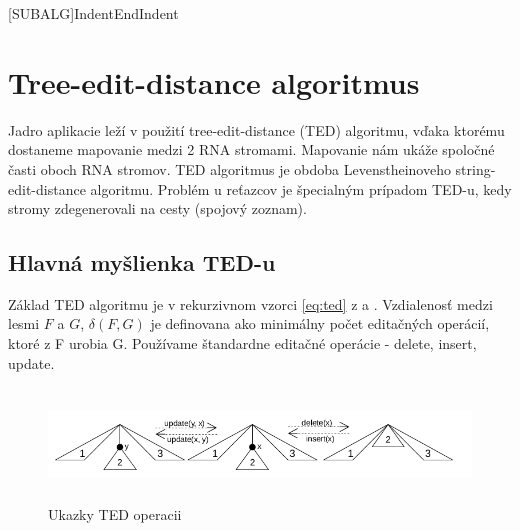 \newcommand{\Cdel}{\ensuremath{c_{del}}}
\newcommand{\Cins}{\ensuremath{c_{ins}}}
\newcommand{\Cupd}{\ensuremath{c_{upd}}}

\newcommand{\AfullDecomposition}{\ensuremath{\mathcal{A}}}
\newcommand{\FrelevantSubforests}{\ensuremath{\mathcal{F}}}
\newcommand{\pluseq}{\stackrel{+}{=}}
\newcommand{\AlgCase}{$\left\{\rule{0pt}{\baselineskip}\right.$\parbox{\textwidth}}

\newcommand{\rtedCostSum}[3]{\sum_{{#1}' \in #1 - \gamma^{#2}(#1)}cena({#1}', #3)}


[SUBALG]{Indent}{EndIndent}{}{\algorithmicend\ }


\chapter{Tree-edit-distance algoritmus}

Jadro aplikacie leží v použití tree-edit-distance (TED) algoritmu,
vďaka ktorému dostaneme mapovanie medzi 2 RNA stromami. Mapovanie nám ukáže
spoločné časti oboch RNA stromov. TED algoritmus je obdoba Levenstheinoveho
string-edit-distance algoritmu. Problém u reťazcov je špecialným prípadom
TED-u, kedy stromy zdegenerovali na cesty (spojový zoznam).

\section{Hlavná myšlienka TED-u}

Základ TED algoritmu je v rekurzivnom vzorci \ref{eq:ted} z \citet{DMRW} a \citet{RTED}. Vzdialenosť medzi
lesmi $F$ a $G$, $\delta(F, G)$ je definovana ako minimálny počet editačných operácií,
ktoré z F urobia G. Používame štandardne editačné operácie - delete, insert, update.

\begin{figure}[H]
\centering
\includegraphics[width=140mm, height=30mm]{../img/TED_operations.png}
\caption{Ukazky TED operacii}
\label{obr:TED_operations}
\end{figure}

